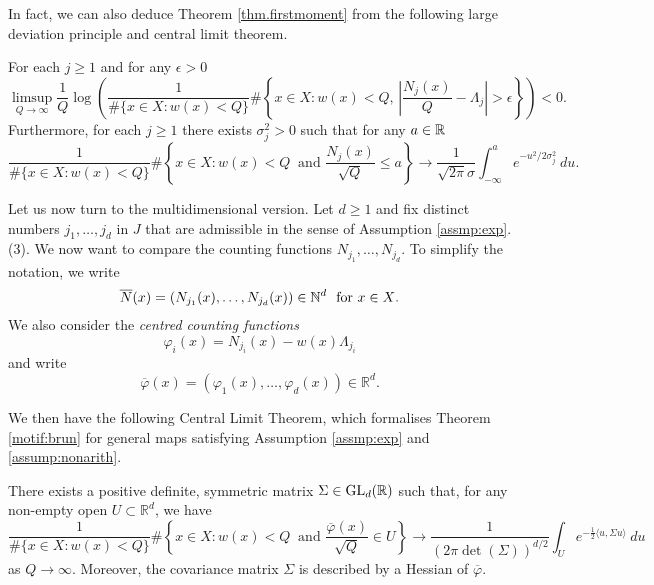 \documentclass[12pt,a4paper,reqno]{amsart}
\begin{document}
In fact, we can  also deduce  Theorem \ref{thm.firstmoment} from the following large deviation principle and central limit theorem.
\begin{theorem} \label{thm.largedev}
For each $j \ge 1$ and  for any $\epsilon >0$
\[
\limsup_{Q\to\infty} \frac{1}{Q} \log \left( \frac{1}{\#\{x \in X : w(x) < Q\}} \#\left\{ x\in X: w(x) < Q, \, \left| \frac{N_j(x)}{Q} - \Lambda_j \right| > \epsilon \right\}\right) < 0.
\]
Furthermore, for each $j \ge 1$ there exists $\sigma^2_j > 0$ such that for any $a \in {\mathbb R}$
\[
\frac{1}{\#\{x \in X: w(x) <Q\}} \#\left\{ x \in X: w(x)< Q \ \text{ and } \frac{N_j(x)}{\sqrt{Q}} \le a \right\} \to \frac{1}{\sqrt{2 \pi} \sigma} \int_{-\infty}^a e^{-u^2/2\sigma_j^2}\ du.
\]
\end{theorem}


\medskip

Let us now turn to the multidimensional version. Let $d\geq 1$ and fix  distinct numbers $j_1, \ldots, j_d $ in $J$ that are
admissible in the sense of Assumption \ref{assmp:exp}.(3). We now want to compare the counting  functions $N_{j_1}, \ldots, N_{j_d}$. To simplify the notation, we write
\begin{equation}\label{eq:nbar}
\overline{N}(x) = (N_{j_1}(x), \ldots, N_{j_d}(x)) \in {\mathbb N}^d \ \text{ for $x \in X$.}
\end{equation}
We  also consider the \emph{centred  counting functions}
\[
\varphi_i(x) = N_{j_i}(x) - w(x)  \Lambda_{j_i} 
\]
and write
\begin{equation}\label{eq:phibar}
\overline{\varphi}(x) = (\varphi_1(x), \ldots, \varphi_d(x)) \in \mathbb{R}^d.
\end{equation}

We then have the following Central Limit Theorem, which formalises Theorem \ref{motif:brun} for general maps satisfying Assumption \ref{assmp:exp}  and \ref{assump:nonarith}.

\begin{theorem}\label{thm.mdclt:intro}
There exists a positive definite, symmetric matrix $\Sigma \in {\rm GL}_d(\mathbb R)$ such that, for any non-empty open $U \subset \mathbb R^d$, we have
\[
\frac{1}{\#\{x \in X: w(x) <Q\}} \#\left\{ x \in X: w(x)< Q \ \text{ and } \frac{\overline{\varphi}(x)}{\sqrt{Q}} \in U \right\} \to \frac{1}{(2 \pi \det(\Sigma))^{d/2}} \int_{U} e^{-\frac{1}{2} \langle u, \Sigma u \rangle} \ du
\]
as $Q\to\infty$.
Moreover, the covariance matrix $\Sigma$ is described by a Hessian of $\overline{\varphi}$.
\end{theorem}
\end{document}
